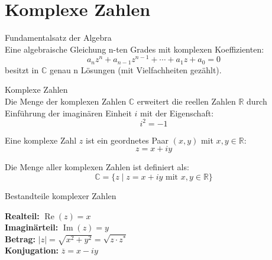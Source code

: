 

\section{Komplexe Zahlen}

\begin{lemma}{Fundamentalsatz der Algebra}\\
Eine algebraische Gleichung n-ten Grades mit komplexen Koeffizienten:
$$a_nz^n + a_{n-1}z^{n-1} + \cdots + a_1z + a_0 = 0$$
besitzt in $\mathbb{C}$ genau n Lösungen (mit Vielfachheiten gezählt).
\end{lemma}

\begin{concept}{Komplexe Zahlen}\\
Die Menge der komplexen Zahlen $\mathbb{C}$ erweitert die reellen Zahlen $\mathbb{R}$ durch Einführung der imaginären Einheit $i$ mit der Eigenschaft:
$$i^2 = -1$$

Eine komplexe Zahl $z$ ist ein geordnetes Paar $(x,y)$ mit $x,y \in \mathbb{R}$:
$$z = x + iy$$

Die Menge aller komplexen Zahlen ist definiert als:
$$\mathbb{C} = \{z \mid z = x + iy \text{ mit } x,y \in \mathbb{R}\}$$
\end{concept}



\begin{definition}{Bestandteile komplexer Zahlen}\\
\begin{minipage}[t]{0.6\textwidth}
    \vspace{-7mm}
    \textbf{Realteil:} $\operatorname{Re}(z) = x$\\
    \textbf{Imaginärteil:} $\operatorname{Im}(z) = y$\\
    \textbf{Betrag:} $|z| = \sqrt{x^2 + y^2} = \sqrt{z \cdot z^*}$\\
    \textbf{Konjugation:} $\overline{z} = x - iy$
\end{minipage}
\begin{minipage}{0.35\textwidth}
    \vspace{-3mm}
\end{minipage}
\end{definition}


